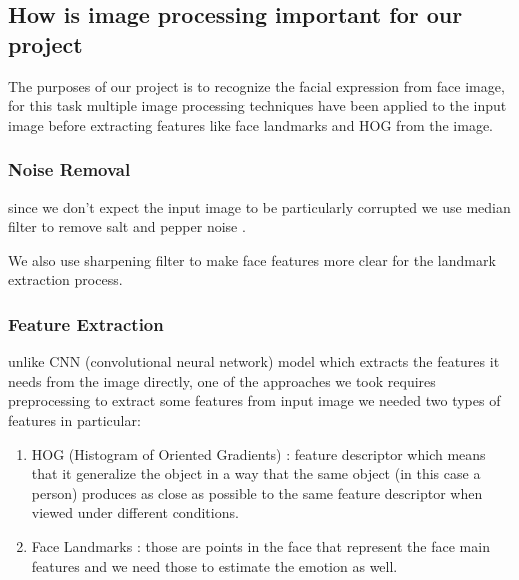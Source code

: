 \subsection{How is image processing important for our project}
The purposes of our project is to recognize the facial expression from face image, for this task multiple image 
processing techniques have been applied to the input image before extracting features like face landmarks and HOG from the image.

\subsubsection{Noise Removal}
since we don't expect the input image to be particularly corrupted we  use median filter to 
remove salt and pepper noise .

We also use sharpening filter to make face features more clear for the landmark extraction process.

\subsubsection{Feature Extraction}
unlike CNN (convolutional neural network) model which extracts the features it needs from the image directly, 
one of the approaches we took requires preprocessing to extract some features from input image
we needed two types of features in particular:
\begin{enumerate}
	\item HOG (Histogram of Oriented Gradients) : feature descriptor which means that it generalize the object in a way that the same object (in this case a person) produces as close as possible to the same feature descriptor when viewed under different conditions.
	\item Face Landmarks : those are points in the face that represent the face main features and we need those to estimate the emotion as well.
\end{enumerate}